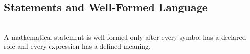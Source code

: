 \subsection{Statements and Well-Formed Language}

\begin{principle} \label{princ:well-formed-statements-and-bound-variables} \\
A mathematical statement is well formed only after every symbol has a declared role and every expression has a defined meaning.
\end{principle}
